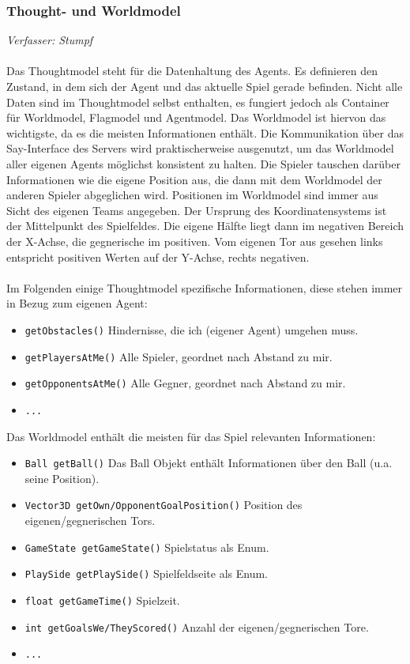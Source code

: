 \documentclass[fontsize=12pt,a4paper,final]{scrartcl}[2003/01/01]
\begin{document}
\subsubsection{Thought- und Worldmodel}
\textit{Verfasser: Stumpf}\\
\\
Das Thoughtmodel steht für die Datenhaltung des Agents. Es definieren den Zustand, in dem sich der Agent und das aktuelle Spiel gerade befinden. Nicht alle Daten sind im Thoughtmodel selbst enthalten, es fungiert jedoch als Container für Worldmodel, Flagmodel und Agentmodel. Das Worldmodel ist hiervon das wichtigste, da es die meisten Informationen enthält. Die Kommunikation über das Say-Interface des Servers wird praktischerweise ausgenutzt, um das Worldmodel aller eigenen Agents möglichst konsistent zu halten. Die Spieler tauschen darüber Informationen wie die eigene Position aus, die dann mit dem Worldmodel der anderen Spieler abgeglichen wird.
Positionen im Worldmodel sind immer aus Sicht des eigenen Teams angegeben. Der Ursprung des Koordinatensystems ist der Mittelpunkt des Spielfeldes. Die eigene Hälfte liegt dann im negativen Bereich der X-Achse, die gegnerische im positiven. Vom eigenen Tor aus gesehen links entspricht positiven Werten auf der Y-Achse, rechts negativen.\\
\\
Im Folgenden einige Thoughtmodel spezifische Informationen, diese stehen immer in Bezug zum eigenen Agent:
\begin{itemize}
\item \texttt{getObstacles()} Hindernisse, die ich (eigener Agent) umgehen muss.
\item \texttt{getPlayersAtMe()} Alle Spieler, geordnet nach Abstand zu mir.
\item \texttt{getOpponentsAtMe()} Alle Gegner, geordnet nach Abstand zu mir.
\item \texttt{...}
\end{itemize}

Das Worldmodel enthält die meisten für das Spiel relevanten Informationen:
\begin{itemize}
\item \texttt{Ball getBall()} Das Ball Objekt enthält Informationen über den Ball (u.a. seine Position).
\item \texttt{Vector3D getOwn/OpponentGoalPosition()} Position des eigenen/gegnerischen Tors. 
\item \texttt{GameState getGameState()} Spielstatus als Enum.
\item \texttt{PlaySide getPlaySide()} Spielfeldseite als Enum.
\item \texttt{float getGameTime()} Spielzeit.
\item \texttt{int getGoalsWe/TheyScored()} Anzahl der eigenen/gegnerischen Tore.
\item \texttt{...}
\end{itemize}
\end{document}
